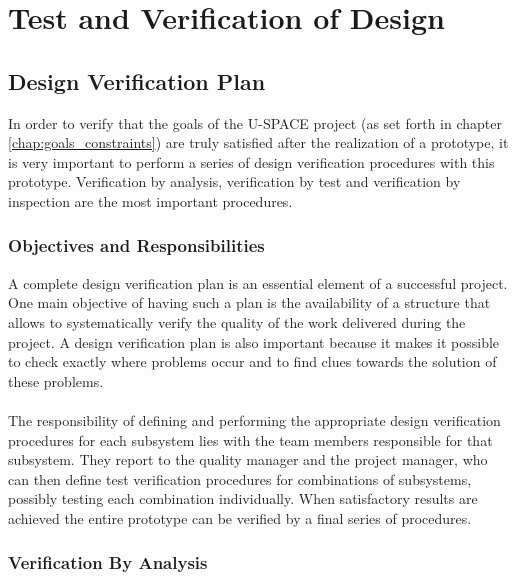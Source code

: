 \chapter{Test and Verification of Design}
\label{chap:test_verification}

\section{Design Verification Plan}
\label{sec:ver_plan}

In order to verify that the goals of the \ac{U-SPACE} project (as set forth in chapter \ref{chap:goals_constraints}) are truly satisfied after the realization of a prototype, it is very important to perform a series of design verification procedures with this prototype. Verification by analysis, verification by test and verification by inspection are the most important procedures.

\subsection{Objectives and Responsibilities}

A complete design verification plan is an essential element of a successful project. One main objective of having such a plan is the availability of a structure that allows to systematically verify the quality of the work delivered during the project. A design verification plan is also important because it makes it possible to check exactly where problems occur and to find clues towards the solution of these problems.
\\
\\
The responsibility of defining and performing the appropriate design verification procedures for each subsystem lies with the team members responsible for that subsystem. They report to the quality manager and the project manager, who can then define test verification procedures for combinations of subsystems, possibly testing each combination individually. When satisfactory results are achieved the entire prototype can be verified by a final series of procedures.

\subsection{Verification By Analysis}

